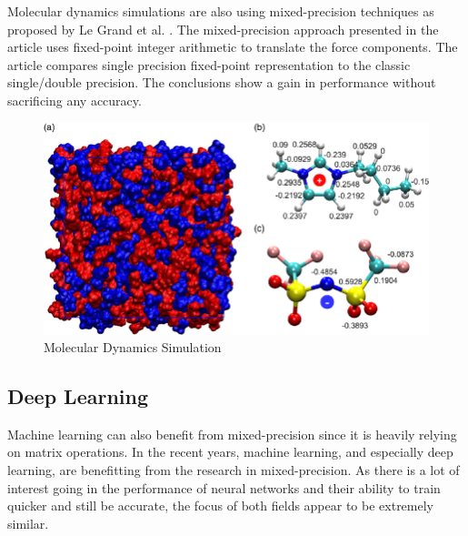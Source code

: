 
Molecular dynamics simulations are also using mixed-precision techniques as proposed by Le Grand et al. \cite{LeGrand2013}. The mixed-precision approach presented in the article uses fixed-point integer arithmetic to translate the force components. The article compares single precision fixed-point representation to the classic single/double precision. The conclusions show a gain in performance without sacrificing any accuracy.

\begin{figure}[htbp]
	\centering
		\includegraphics[width=.7\textwidth]{Figures/MolecularSim.png}
	\caption[Molecular Dynamics Simulation]{Molecular Dynamics Simulation \cite{Feng2019}}
	\label{fig:MolecularSim}
\end{figure}


\subsection{Deep Learning}

Machine learning can also benefit from mixed-precision since it is heavily relying on matrix operations. In the recent years, machine learning, and especially deep learning, are benefitting from the research in mixed-precision. As there is a lot of interest going in the performance of neural networks and their ability to train quicker and still be accurate, the focus of both fields appear to be extremely similar.


